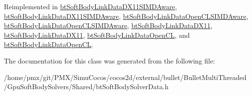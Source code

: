 Reimplemented in \hyperlink{classbtSoftBodyLinkDataDX11SIMDAware_aa8139528d8d1c83643b46e2e3a8a6b35}{bt\+Soft\+Body\+Link\+Data\+D\+X11\+S\+I\+M\+D\+Aware}, \hyperlink{classbtSoftBodyLinkDataDX11SIMDAware_ae43f275f9bc20e56ace8b3223b263ce4}{bt\+Soft\+Body\+Link\+Data\+D\+X11\+S\+I\+M\+D\+Aware}, \hyperlink{classbtSoftBodyLinkDataOpenCLSIMDAware_a9a1482f91ff8105f41a1f991e183e120}{bt\+Soft\+Body\+Link\+Data\+Open\+C\+L\+S\+I\+M\+D\+Aware}, \hyperlink{classbtSoftBodyLinkDataOpenCLSIMDAware_a02bc02902c70fab9bc96d6d8adcc69b5}{bt\+Soft\+Body\+Link\+Data\+Open\+C\+L\+S\+I\+M\+D\+Aware}, \hyperlink{classbtSoftBodyLinkDataDX11_a4ceea7a93543a6a54719e1d77c21cae1}{bt\+Soft\+Body\+Link\+Data\+D\+X11}, \hyperlink{classbtSoftBodyLinkDataDX11_a33aa1666f79ec3e6b065844a02930faf}{bt\+Soft\+Body\+Link\+Data\+D\+X11}, \hyperlink{classbtSoftBodyLinkDataOpenCL_abef476a18a102fffd4dbb73ca2cfb9a4}{bt\+Soft\+Body\+Link\+Data\+Open\+CL}, and \hyperlink{classbtSoftBodyLinkDataOpenCL_a4602606fdbcaa6cd2a976c71f7582398}{bt\+Soft\+Body\+Link\+Data\+Open\+CL}.



The documentation for this class was generated from the following file\+:\begin{DoxyCompactItemize}
\item 
/home/pmx/git/\+P\+M\+X/\+Simu\+Cocos/cocos2d/external/bullet/\+Bullet\+Multi\+Threaded/\+Gpu\+Soft\+Body\+Solvers/\+Shared/bt\+Soft\+Body\+Solver\+Data.\+h\end{DoxyCompactItemize}
